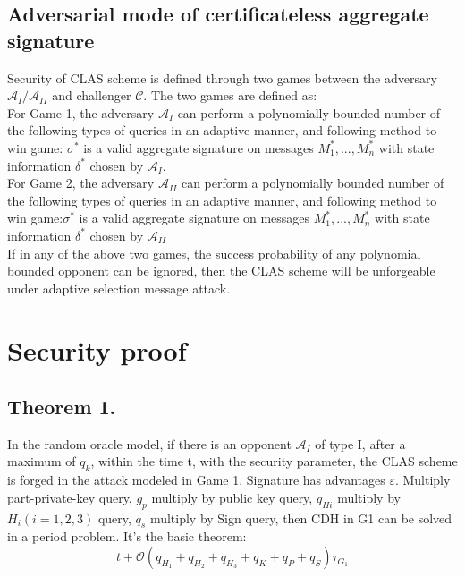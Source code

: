 \documentclass[11pt]{article}
\begin{document}
\subsection{Adversarial mode of certificateless aggregate signature}
Security of CLAS scheme is defined through two games between the adversary \(\mathcal{A}_{I} / \mathcal{A}_{I I}\) and challenger \(\mathcal{C} .\) The two games are defined as:\\
For Game 1, the adversary \(\mathcal{A}_{I}\) can perform a polynomially bounded number of the following types of queries in an adaptive manner, and following method to win game: $\sigma^*$ is a valid aggregate signature on messages ${M^*_1,...,M^*_n}$ with state information $\delta^*$ chosen by \(\mathcal{A}_{I}\).\\
For Game 2, the adversary \(\mathcal{A}_{II}\) can perform a polynomially bounded number of the following types of queries in an adaptive manner, and following method to win game:$\sigma^*$ is a valid aggregate signature on messages ${M^*_1,...,M^*_n}$ with state information $\delta^*$ chosen by \(\mathcal{A}_{II}\)\\
If in any of the above two games, the success probability of any polynomial bounded opponent can be ignored, then the CLAS scheme will be unforgeable under adaptive selection message attack.

\section{Security proof}
\subsection{Theorem 1.}
In the random oracle model, if there is an opponent \(\mathcal{A}_{I}\) of type I, after a maximum of $q_k$, within the time t, with the security parameter, the CLAS scheme is forged in the attack modeled in Game 1. Signature has advantages $\varepsilon$. Multiply part-private-key query, $g_p$ multiply by public key query, $q_{Hi}$ multiply by $H_i (i = 1, 2, 3)$ query, $q_s$ multiply by Sign query, then CDH in G1 can be solved in a period problem. It's the basic theorem:
\begin{equation}
      t+\mathcal{O}\left(q_{H_{1}}+q_{H_{2}}+q_{H_{3}}+q_{K}+q_{P}+q_{S}\right) \tau_{G_{1}}
\end{equation}
\end{document}
